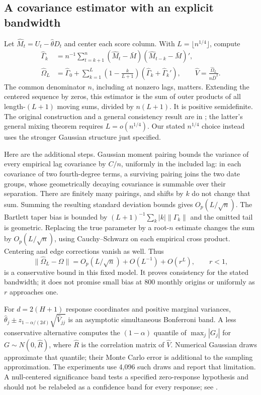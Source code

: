 \subsection{A covariance estimator with an explicit bandwidth}
Let $\widehat M_t=U_t-\widehat\theta D_t$ and center each score column.
With $L=\lfloor n^{1/4}\rfloor$, compute
\begin{align}
 \widehat\Gamma_k&=n^{-1}\sum_{t=k+1}^n
    (\widehat M_t-\bar M)(\widehat M_{t-k}-\bar M)',\nonumber\\
 \widehat\Omega_L&=\widehat\Gamma_0+
   \sum_{k=1}^L\left(1-\frac{k}{L+1}\right)
       (\widehat\Gamma_k+\widehat\Gamma_k'),\qquad
 \widehat V=\frac{\widehat\Omega_L}{n\bar D^2}.
 \label{s4:bartlett}
\end{align}
The common denominator $n$, including at nonzero lags, matters. Extending
the centered sequence by zeros, this estimator is the sum of outer
products of all length-$(L+1)$ moving sums, divided by $n(L+1)$. It is
positive semidefinite. The original construction and a general consistency
result are in \citet[equation (5), Theorems 1--2]{newey1986}; the latter's
general mixing theorem requires $L=o(n^{1/4})$. Our stated $n^{1/4}$
choice instead uses the stronger Gaussian structure just specified.

Here are the additional steps. Gaussian moment pairing bounds the variance
of every empirical lag covariance by $C/n$, uniformly in the included
lag: in each covariance of two fourth-degree terms, a surviving pairing
joins the two date groups, whose geometrically decaying covariance is
summable over their separation. There are finitely many pairings, and
shifts by $k$ do not change that sum. Summing the resulting standard
deviation bounds gives $O_p(L/\sqrt n)$. The Bartlett taper bias is
bounded by $(L+1)^{-1}\sum_k |k|\|\Gamma_k\|$ and the omitted tail
is geometric. Replacing the true parameter by a root-$n$ estimate changes
the sum by $O_p(L/\sqrt n)$, using Cauchy--Schwarz on each empirical
cross product. Centering and edge corrections vanish as well. Thus
\[
 \|\widehat\Omega_L-\Omega\|
 =O_p(L/\sqrt n)+O(L^{-1})+O(r^L),\qquad r<1,
\]
is a conservative bound in this fixed model. It proves consistency for
the stated bandwidth; it does not promise small bias at 800 monthly origins
or uniformly as $r$ approaches one.

For $d=2(H+1)$ response coordinates and positive marginal variances,
$\widehat\theta_j\pm z_{1-\alpha/(2d)}\sqrt{\widehat V_{jj}}$
is an asymptotic simultaneous Bonferroni band. A less conservative
alternative computes the $(1-\alpha)$ quantile of
$\max_j|G_j|$ for $G\sim N(0,\widehat R)$, where $\widehat R$ is
the correlation matrix of $\widehat V$. Numerical Gaussian draws
approximate that quantile; their Monte Carlo error is additional to the
sampling approximation. The experiments use 4,096 such draws and report
that limitation. A null-centered significance band tests a specified
zero-response hypothesis and should not be relabeled as a confidence
band for every response; see \citet[equations (5)--(8)]{inoue2023}.

